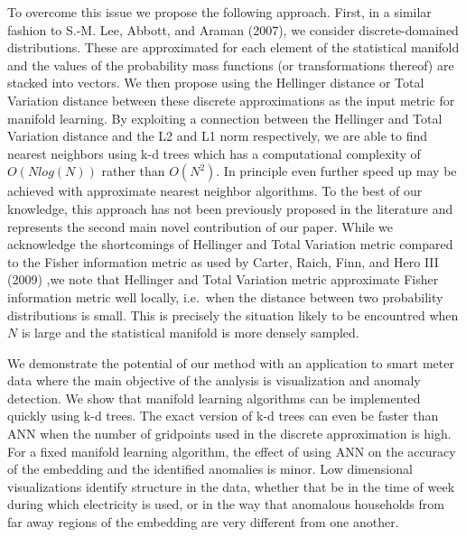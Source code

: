 \documentclass[12pt]{article}
\begin{document}
To overcome this issue we propose the following approach. First, in a similar fashion to S.-M. Lee, Abbott, and Araman (2007), we consider discrete-domained distributions. These are approximated for each element of the statistical manifold and the values of the probability mass functions (or transformations thereof) are stacked into vectors. We then propose using the Hellinger distance or Total Variation distance between these discrete approximations as the input metric for manifold learning. By exploiting a connection between the Hellinger and Total Variation distance and the L2 and L1 norm respectively, we are able to find nearest neighbors using k-d trees which has a computational complexity of \(O(Nlog(N))\) rather than \(O(N^2)\). In principle even further speed up may be achieved with approximate nearest neighbor algorithms. To the best of our knowledge, this approach has not been previously proposed in the literature and represents the second main novel contribution of our paper. While we acknowledge the shortcomings of Hellinger and Total Variation metric compared to the Fisher information metric as used by Carter, Raich, Finn, and Hero III (2009) ,we note that Hellinger and Total Variation metric approximate Fisher information metric well locally, i.e.~when the distance between two probability distributions is small. This is precisely the situation likely to be encountred when \(N\) is large and the statistical manifold is more densely sampled.

We demonstrate the potential of our method with an application to smart meter data where the main objective of the analysis is visualization and anomaly detection. We show that manifold learning algorithms can be implemented quickly using k-d trees. The exact version of k-d trees can even be faster than ANN when the number of gridpoints used in the discrete approximation is high. For a fixed manifold learning algorithm, the effect of using ANN on the accuracy of the embedding and the identified anomalies is minor. Low dimensional visualizations identify structure in the data, whether that be in the time of week during which electricity is used, or in the way that anomalous households from far away regions of the embedding are very different from one another.
\end{document}
